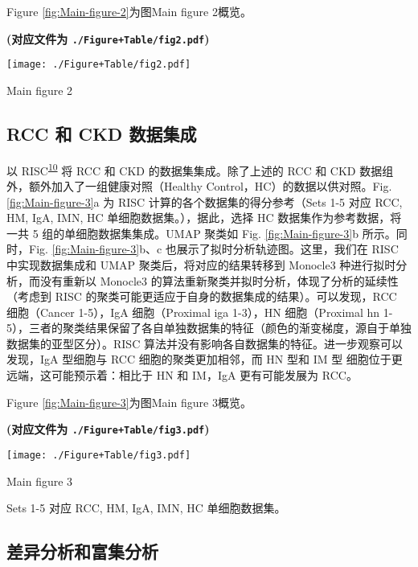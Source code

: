 \documentclass[
]{article}
\begin{document}
Figure \ref{fig:Main-figure-2}为图Main figure 2概览。

\textbf{(对应文件为 \texttt{./Figure+Table/fig2.pdf})}

\def\@captype{figure}
\begin{center}
\texttt{[image: ./Figure+Table/fig2.pdf]}
\caption{Main figure 2}\label{fig:Main-figure-2}
\end{center}

\hypertarget{res-rs}{%
\subsection{RCC 和 CKD 数据集成}\label{res-rs}}

以 RISC\textsuperscript{\protect\hyperlink{ref-RobustIntegratLiuY2021}{10}} 将 RCC 和 CKD 的数据集集成。除了上述的 RCC 和 CKD 数据组外，额外加入了一组健康对照（Healthy Control，HC）的数据以供对照。Fig. \ref{fig:Main-figure-3}a 为 RISC 计算的各个数据集的得分参考（Sets 1-5 对应 RCC, HM, IgA, IMN, HC 单细胞数据集。），据此，选择 HC 数据集作为参考数据，将一共 5 组的单细胞数据集集成。UMAP 聚类如 Fig. \ref{fig:Main-figure-3}b 所示。同时，Fig. \ref{fig:Main-figure-3}b、c 也展示了拟时分析轨迹图。这里，我们在 RISC 中实现数据集成和 UMAP 聚类后，将对应的结果转移到 Monocle3 种进行拟时分析，而没有重新以 Monocle3 的算法重新聚类并拟时分析，体现了分析的延续性（考虑到 RISC 的聚类可能更适应于自身的数据集成的结果）。可以发现，RCC 细胞（Cancer 1-5），IgA 细胞（Proximal iga 1-3），HN 细胞（Proximal hn 1-5），三者的聚类结果保留了各自单独数据集的特征（颜色的渐变梯度，源自于单独数据集的亚型区分）。RISC 算法并没有影响各自数据集的特征。进一步观察可以发现，IgA 型细胞与 RCC 细胞的聚类更加相邻，而 HN 型和 IM 型 细胞位于更远端，这可能预示着：相比于 HN 和 IM，IgA 更有可能发展为 RCC。

Figure \ref{fig:Main-figure-3}为图Main figure 3概览。

\textbf{(对应文件为 \texttt{./Figure+Table/fig3.pdf})}

\def\@captype{figure}
\begin{center}
\texttt{[image: ./Figure+Table/fig3.pdf]}
\caption{Main figure 3}\label{fig:Main-figure-3}
\end{center}

Sets 1-5 对应 RCC, HM, IgA, IMN, HC 单细胞数据集。

\hypertarget{res-en}{%
\subsection{差异分析和富集分析}\label{res-en}}
\end{document}
